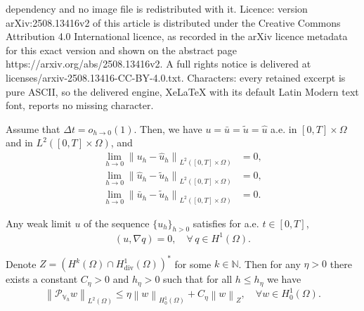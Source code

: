 \documentclass[10pt,a4paper]{amsart}
\newcommand\norm[1]{\left\lVert#1\right\rVert}
\newcommand{\Div}{\operatorname{div}}
\newcommand{\Grad}{\nabla}
\newcommand{\N}{\mathbb{N}}
\newcommand{\PVh}{\mathcal{P}_{\Vh}}
\newcommand{\Vh}{\mathbb{V}_h}
\newcommand{\dom}{\Omega}
\newcommand{\hu}{\widehat{u}}
\newcommand{\tu}{\widetilde{u}}
\begin{document}
dependency and no image file is redistributed with it. Licence: version arXiv:2508.13416v2 of this article is distributed under the Creative Commons Attribution 4.0 International licence, as recorded in the arXiv licence metadata for this exact version and shown on the abstract page https://arxiv.org/abs/2508.13416v2. A full rights notice is delivered at licenses/arxiv-2508.13416-CC-BY-4.0.txt. Characters: every retained excerpt is pure ASCII, so the delivered engine, XeLaTeX with its default Latin Modern text font, reports no missing character.
\begin{lemma}
	\label{lem:samelimits}
	Assume that  $\Delta t = o_{h\to 0}(1)$. Then, we have 
	$u=\bar{u}=\tu=\hu$ a.e. in $[0,T]\times\dom$ and in $L^2([0,T]\times\dom)$, and
	\begin{align}
		\label{eq:uubarconv}
		\lim_{h\to 0}\norm{u_h-\hu_h}_{L^2([0,T]\times\dom)} &= 0,\\
		\label{eq:utildeuhatconv}
		\lim_{h\to 0}\norm{\hu_h-\tu_h}_{L^2([0,T]\times\dom)}& = 0,\\
		\label{eq:utildeubarconv}
		\lim_{h\to 0}\norm{\bar{u}_h-\tu_h}_{L^2([0,T]\times\dom)}& = 0.
	\end{align}	
\end{lemma}

\begin{lemma}\label{lem:divfree2}
	Any weak limit $u$ of the sequence $\{u_h\}_{h>0}$ satisfies for a.e. $t\in [0,T]$,
	\begin{equation*}
		(u,\Grad q) = 0,\quad \forall \, q\in H^1(\dom).
	\end{equation*}
	
\end{lemma}

\begin{lemma}\label{lem:lionslike}
	Denote $Z = (H^k(\dom)\cap H^1_{\Div}(\dom))^*$ for some $k\in \N$. Then for any $\eta>0$ there exists a constant $C_\eta>0$ and $h_\eta>0 $ such that for all $h\leq h_{\eta}$ we have
	\begin{equation}\label{eq:lionslike}
		\norm{\PVh w}_{L^2(\dom)}\leq \eta \norm{w}_{H^1_0(\dom)} + C_\eta \norm{w}_Z,\quad \forall w\in H^1_0(\dom).
	\end{equation}
\end{lemma}	
\end{document}

